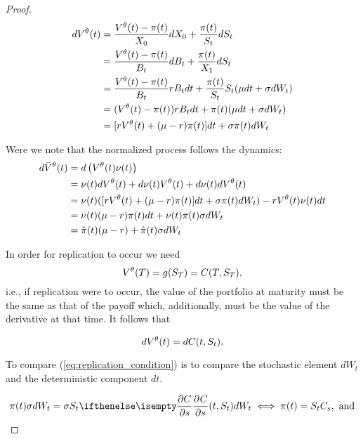 \documentclass[../TGMAFFIRO.tex]{subfiles}
\begin{document}
\begin{proof}
	\begin{align}
		dV^\theta(t) &=  \frac{V^\theta(t) - \pi(t)}{X_0}dX_0 + \frac{\pi(t)}{S_t} dS_t \nonumber\\
		&= \frac{V^\theta(t) - \pi(t)}{B_t} dB_t + \frac{\pi(t)}{X_1} dS_t\nonumber\\
		&= \frac{V^\theta(t) - \pi(t)}{B_t} r B_t dt + \frac{\pi(t)}{S_t} S_t(\mu dt + \sigma dW_t)\nonumber\\
		&= (V^\theta(t) - \pi(t)) r B_t dt  + \pi(t)(\mu dt + \sigma dW_t) 	\nonumber\\
		&= [rV^\theta(t) + (\mu - r) \pi(t)] dt + \sigma\pi(t) dW_t
	\end{align}
	
	Were we note that the normalized process follows the dynamics:
	\begin{align}
		d\bar{V}^\theta(t) &= d\left(V^\theta(t) \nu(t)\right) \nonumber \\
		&= \nu(t) dV^\theta(t) + d\nu(t) V^\theta(t) + d\nu(t) dV^\theta(t) \nonumber \\
		&= \nu(t)([rV^\theta(t) + (\mu - r) \pi(t)] dt + \sigma\pi(t) dW_t) - r V^\theta(t)\nu(t)dt\nonumber\\
		&= \nu(t)(\mu - r) \pi(t) dt + \nu(t)\pi(t) \sigma dW_t \nonumber \\
		&= \hat \pi(t) (\mu - r) + \hat \pi(t) \sigma dW_t
	\end{align}
	
	In order for replication to occur we need
	\begin{equation}
		V^\theta(T) = g(S_T) = C(T, S_T),
	\end{equation}
	i.e., if replication were to occur, the value of the portfolio at maturity must be the same as that of the payoff which, additionally, must be the value of the derivative at that time. It follows that
	
	\begin{equation}\label{eq:replication_condition}
		dV^\theta(t) = dC(t, S_t).
	\end{equation}
	
	To compare (\ref{eq:replication_condition}) is to compare the stochastic element $dW_t$ and the deterministic component $dt$.
	
	\begin{equation}
		\pi(t) \sigma dW_t = \sigma S_t \partialwrt{C}{s}{(t, S_t)}dW_t \iff \pi(t) = S_t C_s, \text{ and}
	\end{equation}
	

\end{proof}
\end{document}
